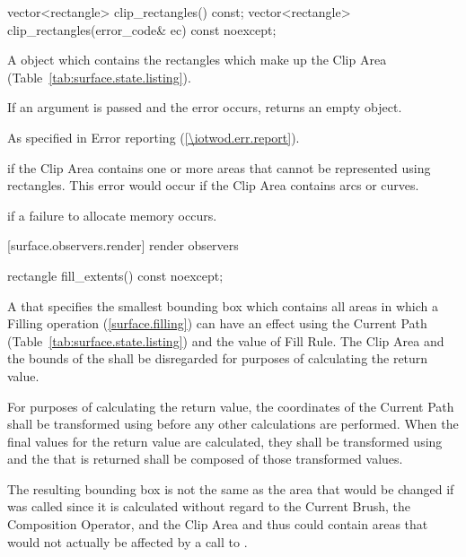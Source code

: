 \begin{itemdecl}
vector<rectangle> clip_rectangles() const;
vector<rectangle> clip_rectangles(error_code& ec) const noexcept;
\end{itemdecl}
\begin{itemdescr}
\pnum
\returns
A  object which contains the rectangles which make up the Clip Area (Table~\ref{tab:surface.state.listing}).

\pnum
If an  argument is passed and the error  occurs, returns an empty  object.

\pnum
\throws
As specified in Error reporting (\ref{\iotwod.err.report}).

\pnum
\errors
{} if the Clip Area contains one or more areas that cannot be represented using rectangles.
\enterexample
This error would occur if the Clip Area contains arcs or curves.
\exitexample

\pnum
{} if a failure to allocate memory occurs.
\end{itemdescr}

 [surface.observers.render] { render observers}

\begin{itemdecl}
rectangle fill_extents() const noexcept;
\end{itemdecl}
\begin{itemdescr}
\pnum
\returns
A  that specifies the smallest bounding box which contains all areas in which a Filling operation (\ref{surface.filling}) can have an effect using the Current Path (Table~\ref{tab:surface.state.listing}) and the value of Fill Rule. The Clip Area and the bounds of the \underlyingsurface shall be disregarded for purposes of calculating the return value.

\pnum
For purposes of calculating the return value, the coordinates of the Current Path shall be transformed using  before any other calculations are performed. When the final values for the return value are calculated, they shall be transformed using  and the  that is returned shall be composed of those transformed values.

\pnum
\realnotes
The resulting bounding box is not the same as the area that would be changed if  was called since it is calculated without regard to the Current Brush, the Composition Operator, and the Clip Area and thus could contain areas that would not actually be affected by a call to .
\end{itemdescr}

